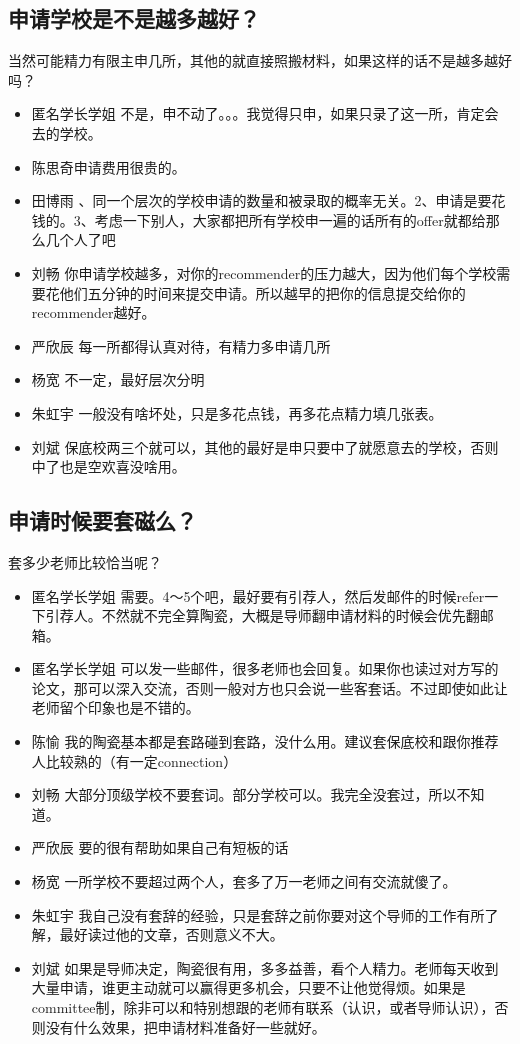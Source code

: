 \documentclass{vivid_layout}
\begin{document}
\subsection{ 申请学校是不是越多越好？}
当然可能精力有限主申几所，其他的就直接照搬材料，如果这样的话不是越多越好吗？
\begin{itemize}
\item   {\name 匿名学长学姐}  \quad 不是，申不动了。。。我觉得只申，如果只录了这一所，肯定会去的学校。
\item { 陈思奇}\quad 申请费用很贵的。
\item  { 田博雨}  、同一个层次的学校申请的数量和被录取的概率无关。2、申请是要花钱的。3、考虑一下别人，大家都把所有学校申一遍的话所有的offer就都给那么几个人了吧
\item  { 刘畅}  \quad 你申请学校越多，对你的recommender的压力越大，因为他们每个学校需要花他们五分钟的时间来提交申请。所以越早的把你的信息提交给你的recommender越好。
\item  { 严欣辰}  \quad 每一所都得认真对待，有精力多申请几所
\item  { 杨宽}  \quad 不一定，最好层次分明
\item  { 朱虹宇}  \quad 一般没有啥坏处，只是多花点钱，再多花点精力填几张表。
\item  { 刘斌}  \quad 保底校两三个就可以，其他的最好是申只要中了就愿意去的学校，否则中了也是空欢喜没啥用。
\end{itemize}

\subsection{申请时候要套磁么？}
套多少老师比较恰当呢？
\begin{itemize}
\item   {\name 匿名学长学姐}  \quad 需要。4～5个吧，最好要有引荐人，然后发邮件的时候refer一下引荐人。不然就不完全算陶瓷，大概是导师翻申请材料的时候会优先翻邮箱。
\item   {\name 匿名学长学姐}  \quad  可以发一些邮件，很多老师也会回复。如果你也读过对方写的论文，那可以深入交流，否则一般对方也只会说一些客套话。不过即使如此让老师留个印象也是不错的。
\item  { 陈愉}  \quad 我的陶瓷基本都是套路碰到套路，没什么用。建议套保底校和跟你推荐人比较熟的（有一定connection）
\item  { 刘畅}  \quad 大部分顶级学校不要套词。部分学校可以。我完全没套过，所以不知道。
\item  { 严欣辰}  \quad 要的很有帮助如果自己有短板的话
\item  { 杨宽}  \quad 一所学校不要超过两个人，套多了万一老师之间有交流就傻了。
\item  { 朱虹宇}  \quad 我自己没有套辞的经验，只是套辞之前你要对这个导师的工作有所了解，最好读过他的文章，否则意义不大。
\item  { 刘斌}  \quad 如果是导师决定，陶瓷很有用，多多益善，看个人精力。老师每天收到大量申请，谁更主动就可以赢得更多机会，只要不让他觉得烦。如果是committee制，除非可以和特别想跟的老师有联系（认识，或者导师认识），否则没有什么效果，把申请材料准备好一些就好。
\end{itemize}
\end{document}
